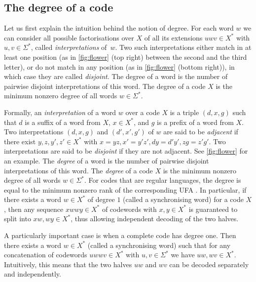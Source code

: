 \subsection{The degree of a code}
Let us first explain the intuition behind the notion of degree. For each word $w$ we can consider all possible factorisations over $X$ of all its extensions $uwv \in X^*$ with $u, v \in \Sigma^*$, called \emph{interpretations} of~$w$. Two such interpretations either match in at least one position (as in \autoref{fig:flower} (top right) between the second and the third letter), or do not match in any position (as in \autoref{fig:flower} (bottom right)), in which case they are called \emph{disjoint}. The degree of a word is the number of pairwise disjoint interpretations of this word. The degree of a code
$X$ is the minimum nonzero degree of all words $w \in \Sigma^*$. 

Formally, an \emph{interpretation} of a word $w$ over a code $X$ is a triple $(d, x, g)$ such that $d$ is a suffix of a word from $X$, $x \in X^*$, and $g$ is a prefix of a word from $X$. Two interpretations $(d, x, g)$ and $(d', x', g')$ of $w$ are said to be \emph{adjacent} if there exist $y, z, y', z' \in X^*$ with 
$x = yz, x' = y'z', dy = d'y', zg = z'g'.$ Two interpretations are said to be \emph{disjoint} if they are not adjacent. See \autoref{fig:flower} for an example. The \emph{degree} of a word is the number of pairwise disjoint interpretations of this word. The \emph{degree} of a code $X$ is the minimum nonzero degree of all words $w \in \Sigma^*$. For codes that are regular languages, the degree is equal to the minimum nonzero rank of the corresponding UFA \cite[Proposition 9.6.1]{Berstel2010}. In particular, if there exists a word $w \in X^*$ of degree $1$ (called a synchronising word) for a code $X$, then any sequence $xwwy \in X^*$ of codewords with $x, y \in X^*$ is guaranteed to split into $xw, wy \in X^*$, thus allowing independent decoding of the two halves.

A particularly important case is when a complete code has degree one. Then
there exists a word $w \in X^*$ (called a synchronising word) such that for any concatenation of codewords $uwwv \in X^*$  with $u, v \in \Sigma^*$ we have $uw, wv \in X^*$. Intuitively, this means that the two halves $uw$ and $wv$ can be decoded separately and independently.


